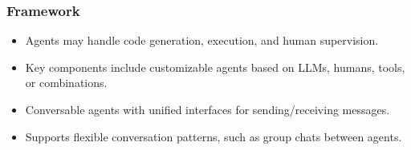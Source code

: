 \begin{frame}[fragile]\frametitle{Framework}
  \begin{itemize}
    \item Agents may handle code generation, execution, and human supervision.
    \item Key components include customizable agents based on LLMs, humans, tools, or combinations.
    \item Conversable agents with unified interfaces for sending/receiving messages.
    \item Supports flexible conversation patterns, such as group chats between agents.
  \end{itemize}
\end{frame}

	
	


